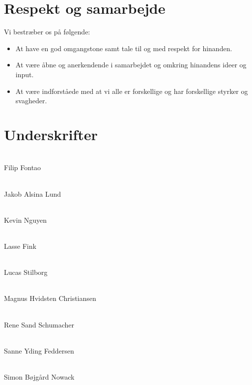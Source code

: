 \documentclass[a4paper,12pt]{article}
\begin{document}
\section*{Respekt og samarbejde}
Vi bestræber os på følgende:
\begin{itemize}
    \item At have en god omgangstone samt tale til og med respekt for hinanden.
    \item At være åbne og anerkendende i samarbejdet og omkring hinandens ideer og input.
    \item At være indforståede med at vi alle er forskellige og har forskellige styrker og svagheder.
\end{itemize}

\section*{Underskrifter}

\vspace{1cm}

\noindent\makebox[\textwidth]{\hrulefill}\\
Filip Fontao

\vspace{1cm}

\noindent\makebox[\textwidth]{\hrulefill}\\
Jakob Alsina Lund

\vspace{1cm}

\noindent\makebox[\textwidth]{\hrulefill}\\
Kevin Nguyen

\vspace{1cm}

\noindent\makebox[\textwidth]{\hrulefill}\\
Lasse Fink

\vspace{1cm}

\noindent\makebox[\textwidth]{\hrulefill}\\
Lucas Stilborg

\vspace{1cm}

\noindent\makebox[\textwidth]{\hrulefill}\\
Magnus Hvidsten Christiansen

\vspace{1cm}

\noindent\makebox[\textwidth]{\hrulefill}\\
Rene Sand Schumacher

\vspace{1cm}

\noindent\makebox[\textwidth]{\hrulefill}\\
Sanne Yding Feddersen

\vspace{1cm}

\noindent\makebox[\textwidth]{\hrulefill}\\
Simon Bøjgård Nowack
\end{document}
